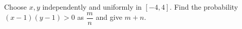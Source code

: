 Choose $x,y$ independently and uniformly in $[-4,4]$. Find the probability $(x-1)(y-1)>0$ as $\dfrac{m}{n}$ and give $m+n$.
